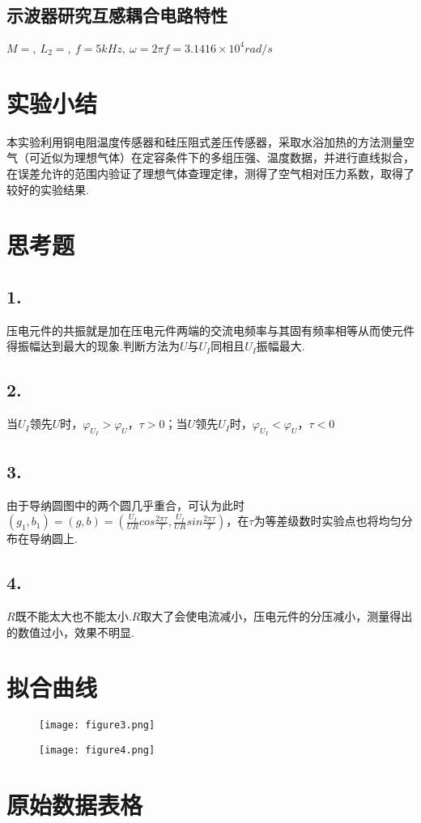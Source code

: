 \documentclass{thureport}
\begin{document}
\subsection{示波器研究互感耦合电路特性}
$M=,\ L_2=,\ f=5kHz,\ \omega=2\pi f=3.1416\times10^4rad/s$

\section{实验小结}
本实验利用铜电阻温度传感器和硅压阻式差压传感器，采取水浴加热的方法测量空气（可近似为理想气体）在定容条件下的多组压强、温度数据，并进行直线拟合，在误差允许的范围内验证了理想气体查理定律，测得了空气相对压力系数，取得了较好的实验结果.

\section{思考题}
\subsection*{1.}
压电元件的共振就是加在压电元件两端的交流电频率与其固有频率相等从而使元件得振幅达到最大的现象.判断方法为$U$与$U_I$同相且$U_I$振幅最大.

\subsection*{2.}
当$U_I$领先$U$时，$\varphi_{U_I}>\varphi_{U}$，$\tau>0$；当$U$领先$U_I$时，$\varphi_{U_I}<\varphi_{U}$，$\tau<0$

\subsection*{3.}
由于导纳圆图中的两个圆几乎重合，可认为此时$(g_1,b_1)=(g,b)=(\frac{U_I}{UR}cos\frac{2\pi\tau}{T},\frac{U_I}{UR}sin\frac{2\pi\tau}{T})$，在$\tau$为等差级数时实验点也将均匀分布在导纳圆上.

\subsection*{4.}
$R$既不能太大也不能太小.$R$取大了会使电流减小，压电元件的分压减小，测量得出的数值过小，效果不明显.

\clearpage
\section{拟合曲线}
\begin{figure}[h]
	\centering
	\texttt{[image: figure3.png]}
\end{figure}

\begin{figure}[h]
	\centering
	\texttt{[image: figure4.png]}
\end{figure}

\clearpage
\section{原始数据表格}
\clearpage

\clearpage
\end{document}
